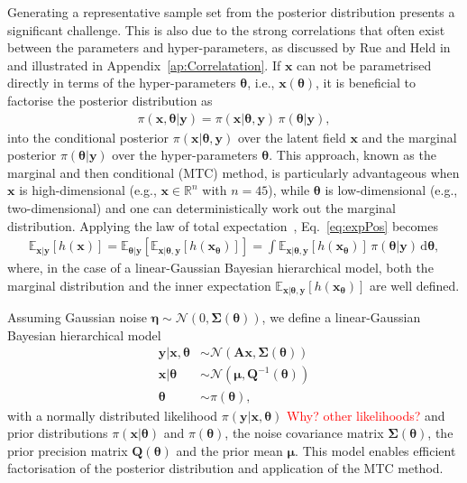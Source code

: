 Generating a representative sample set from the posterior distribution presents a significant challenge. This is also due to the strong correlations that often exist between the parameters and hyper-parameters, as discussed by Rue and Held in \cite{rue2005gaussian} and illustrated in Appendix~\ref{ap:Correlatation}.
If $\bm{x}$ can not be parametrised directly in terms of the hyper-parameters $\bm{\theta}$, i.e., $\bm{x}(\bm{\theta})$, it is beneficial to factorise the posterior distribution as
\begin{align}
	\pi(\bm{x}, \bm{\theta} |  \bm{y}) = \pi(\bm{x} |  \bm{\theta}, \bm{y}) \, \pi(\bm{\theta} |   \bm{y}),
\end{align}
into the conditional posterior $\pi(\bm{x} |  \bm{\theta}, \bm{y})$ over the latent field $\bm{x}$ and the marginal posterior $\pi(\bm{\theta} |  \bm{y})$ over the hyper-parameters $\bm{\theta}$.
This approach, known as the marginal and then conditional (MTC) method, is particularly advantageous when $\bm{x}$ is high-dimensional (e.g., $\bm{x} \in \mathbb{R}^n$ with $n = 45$), while $\bm{\theta}$ is low-dimensional (e.g., two-dimensional) and one can deterministically work out the marginal distribution.
Applying the law of total expectation~\cite{champ2022generalizedlawtotalcovariance}, Eq.~\eqref{eq:expPos} becomes
\begin{align}
	\mathbb{E}_{\bm{x} |  \bm{y}} [h(\bm{x})] 
	= \mathbb{E}_{\bm{\theta} |  \bm{y}} \left[ \mathbb{E}_{\bm{x} |  \bm{\theta}, \bm{y}} [h(\bm{x}_{\bm{\theta}})] \right] 
	= \int \mathbb{E}_{\bm{x} |  \bm{\theta}, \bm{y}} \left[ h(\bm{x}_{\bm{\theta}}) \right] \, \pi(\bm{\theta} |  \bm{y}) \, \mathrm{d}\bm{\theta},
	\label{eq:MargExpPos}
\end{align}
where, in the case of a linear-Gaussian Bayesian hierarchical model, both the marginal distribution and the inner expectation $\mathbb{E}_{\bm{x} |  \bm{\theta}, \bm{y}} \left[ h(\bm{x}_{\bm{\theta}}) \right]$ are well defined.

Assuming Gaussian noise $\bm{\eta} \sim \mathcal{N}(0, \bm{\Sigma}(\bm{\theta}))$, we define a linear-Gaussian Bayesian hierarchical model~\cite{fox2016fast}
\begin{subequations}
	\begin{align}
		\bm{y} |  \bm{x}, \bm{\theta} &\sim \mathcal{N}(\bm{A} \bm{x}, \bm{\Sigma}(\bm{\theta})) \label{eq:likelihood} \\
		\bm{x} |  \bm{\theta} &\sim \mathcal{N}(\bm{\mu}, \bm{Q}^{-1}(\bm{\theta})) \label{eq:xPrior} \\
		\bm{\theta} &\sim \pi(\bm{\theta}) \label{eq:gammaPrior},
	\end{align}
	\label{eq:BayMode}
\end{subequations}
with a normally distributed likelihood $\pi(\bm{y} |  \bm{x}, \bm{\theta})$ \textcolor{red}{Why? other likelihoods?} and prior distributions $\pi(\bm{x} |  \bm{\theta})$ and $\pi(\bm{\theta})$, the noise covariance matrix $\bm{\Sigma}(\bm{\theta})$, the prior precision matrix $\bm{Q}(\bm{\theta})$ and the prior mean $\bm{\mu}$.
This model enables efficient factorisation of the posterior distribution and application of the MTC method.




